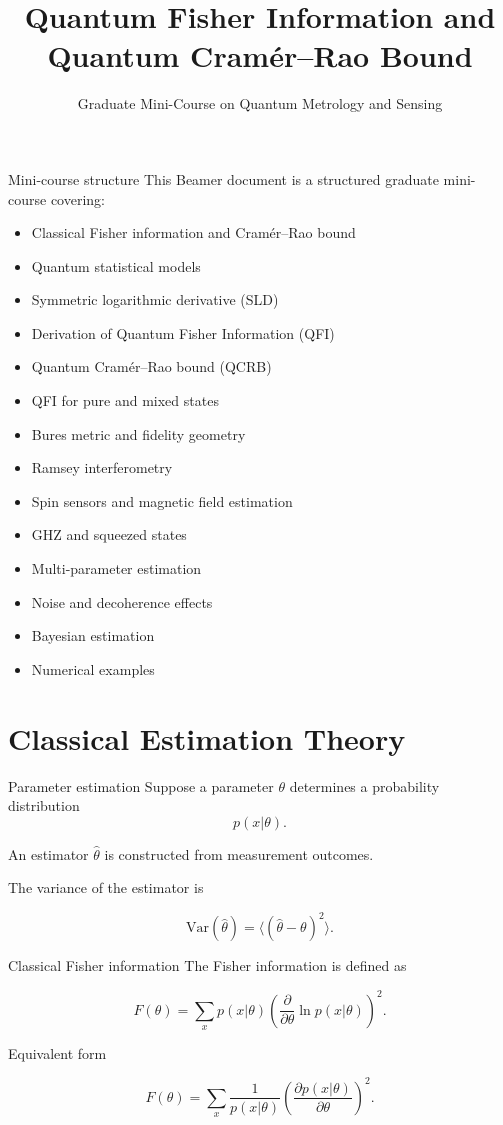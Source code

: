 \documentclass[aspectratio=169]{beamer}
\title{Quantum Fisher Information and Quantum Cramér–Rao Bound}
\subtitle{Graduate Mini-Course on Quantum Metrology and Sensing}
\author{}
\date{}
\begin{document}
\frame{\titlepage}

\begin{frame}{Mini-course structure}
This Beamer document is a structured graduate mini-course covering:
\begin{itemize}
\item Classical Fisher information and Cramér–Rao bound
\item Quantum statistical models
\item Symmetric logarithmic derivative (SLD)
\item Derivation of Quantum Fisher Information (QFI)
\item Quantum Cramér–Rao bound (QCRB)
\item QFI for pure and mixed states
\item Bures metric and fidelity geometry
\item Ramsey interferometry
\item Spin sensors and magnetic field estimation
\item GHZ and squeezed states
\item Multi-parameter estimation
\item Noise and decoherence effects
\item Bayesian estimation
\item Numerical examples
\end{itemize}
\end{frame}

\section{Classical Estimation Theory}

\begin{frame}{Parameter estimation}
Suppose a parameter $\theta$ determines a probability distribution
\begin{equation}
p(x|\theta).
\end{equation}

An estimator $\hat{\theta}$ is constructed from measurement outcomes.

The variance of the estimator is

\begin{equation}
\mathrm{Var}(\hat{\theta})
=
\langle(\hat{\theta}-\theta)^2\rangle .
\end{equation}
\end{frame}

\begin{frame}{Classical Fisher information}
The Fisher information is defined as

\begin{equation}
F(\theta)
=
\sum_x
p(x|\theta)
\left(
\frac{\partial}{\partial \theta}
\ln p(x|\theta)
\right)^2 .
\end{equation}

Equivalent form

\begin{equation}
F(\theta)
=
\sum_x
\frac{1}{p(x|\theta)}
\left(
\frac{\partial p(x|\theta)}{\partial \theta}
\right)^2 .
\end{equation}
\end{frame}
\end{document}
